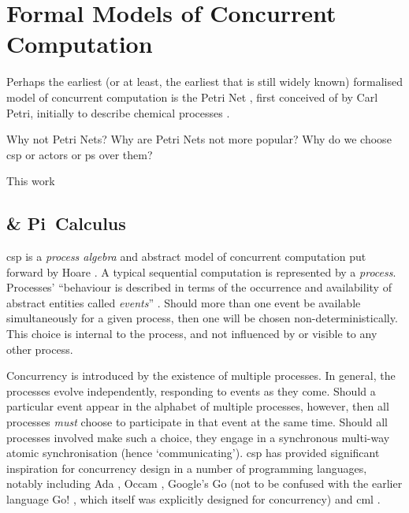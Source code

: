 \section{Formal Models of Concurrent Computation}
Perhaps the earliest (or at least, the earliest that is still widely known) formalised model of concurrent computation is the Petri Net \cite{Dennis2011}, first conceived of by Carl Petri, initially to describe chemical processes \cite{Petri2008}.

\begin{anfxerror}{Why not Petri Nets?}
Why are Petri Nets not more popular?  Why do we choose \gls{csp} or \glspl{actor} or \gls{ps} over them?
\end{anfxerror}

\cite{Varela2013}

This work 

\subsection{ \& Pi~Calculus}

\gls{csp} is a \emph{process algebra} and abstract model of concurrent computation put forward by Hoare \cite{Hoare1985,Roscoe2011}.  A typical sequential computation is represented by a \emph{process}.  Processes' \enquote{behaviour is described in terms of the occurrence and availability of abstract entities called \textit{events}} \cite[p.~478]{Roscoe2011}.  Should more than one event be available simultaneously for a given process, then one will be chosen non-deterministically.  This choice is internal to the process, and not influenced by or visible to any other process.

Concurrency is introduced by the existence of multiple processes.  In general, the processes evolve independently, responding to events as they come.  Should a particular event appear in the alphabet of multiple processes, however, then all processes \emph{must} choose to participate in that event at the same time.  Should all processes involved make such a choice, they engage in a synchronous multi-way atomic synchronisation (hence `communicating').  \gls{csp} has provided significant inspiration for concurrency design in a number of programming languages, notably including Ada \cite{Defense1983,Taft2013}, Occam \cite{Elizabeth1987}, Google's Go \cite{Meyerson2014} (not to be confused with the earlier language Go! \cite{Clark2004}, which itself was explicitly designed for concurrency) and \gls{cml} \cite{Reppy2011}. 

